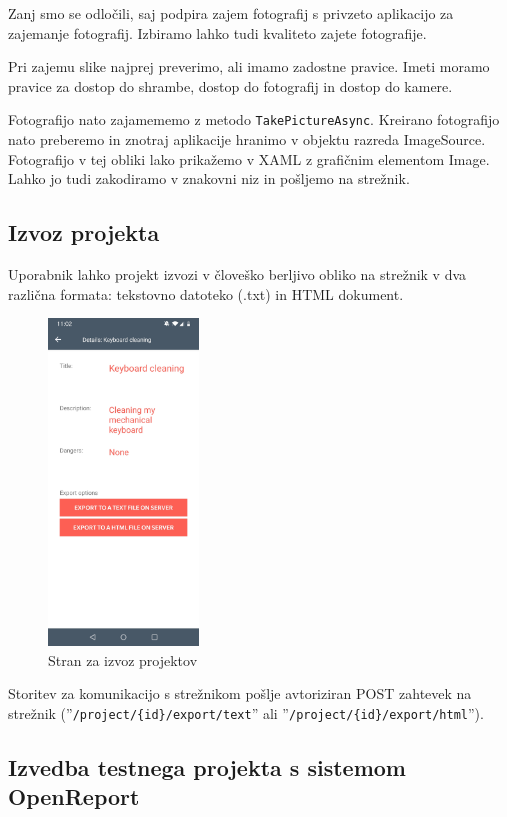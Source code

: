 \documentclass[a4paper, 12pt]{book}
\begin{document}
Zanj smo se odločili, saj podpira zajem fotografij s privzeto aplikacijo za zajemanje fotografij.
Izbiramo lahko tudi kvaliteto zajete fotografije.

Pri zajemu slike najprej preverimo, ali imamo zadostne pravice.
Imeti moramo pravice za dostop do shrambe, dostop do fotografij in dostop do kamere.

Fotografijo nato zajamememo z metodo \texttt{TakePictureAsync}.
Kreirano fotografijo nato preberemo in znotraj aplikacije hranimo v objektu razreda ImageSource.
Fotografijo v tej obliki lako prikažemo v XAML z grafičnim elementom Image.
Lahko jo tudi zakodiramo v znakovni niz in pošljemo na strežnik.


\subsection{Izvoz projekta}

Uporabnik lahko projekt izvozi v človeško berljivo obliko na strežnik v dva različna formata: tekstovno datoteko (.txt) in HTML dokument.

\begin{figure}[H]
\begin{center}
	\includegraphics[width=4cm]{app_project_export}
\end{center}
	\caption{Stran za izvoz projektov}
\label{app_note}
\end{figure}

Storitev za komunikacijo s strežnikom pošlje avtoriziran POST zahtevek na strežnik (''\texttt{/project/\{id\}/export/text}'' ali ''\texttt{/project/\{id\}/export/html}'').

\subsection{Izvedba testnega projekta s sistemom OpenReport}
\end{document}
